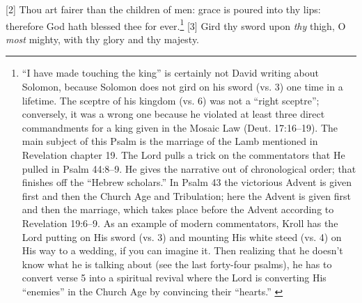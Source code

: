 [2] \textcolor[rgb]{0.00,0.00,1.00}{Thou art fairer than the children of men: grace is poured into thy lips: therefore God hath blessed thee for ever.}\footnote{“I have made touching the king” is certainly not David writing about Solomon, because Solomon does not gird on his sword (vs. 3) one time in a lifetime. The sceptre of his kingdom (vs. 6) was not a “right sceptre”; conversely, it was a wrong one because he violated at least three direct commandments for a king given in the Mosaic Law (Deut. 17:16–19). The main subject of this Psalm is the marriage of the Lamb mentioned in Revelation chapter 19.  The Lord pulls a trick on the commentators that He pulled in Psalm 44:8–9. He gives the narrative out of chronological order; that finishes off the “Hebrew scholars.” In Psalm 43 the victorious Advent is given first and then the Church Age and Tribulation; here the Advent is given first and then the marriage, which takes place before the Advent according to Revelation 19:6–9. As an example of modern commentators, Kroll has the Lord putting on His sword (vs. 3) and mounting His white steed (vs. 4) on His way to a wedding, if you can imagine it. Then realizing that he doesn’t know what he is talking about (see the last forty-four psalms), he has to convert verse 5 into a spiritual revival where the Lord is converting His “enemies” in the Church Age by convincing their “hearts.” \cite{Ruckman1992Psalms}}
[3] \textcolor[rgb]{0.00,0.00,1.00}{Gird thy sword upon \emph{thy} thigh, O \emph{most} mighty, with thy glory and thy majesty.}
